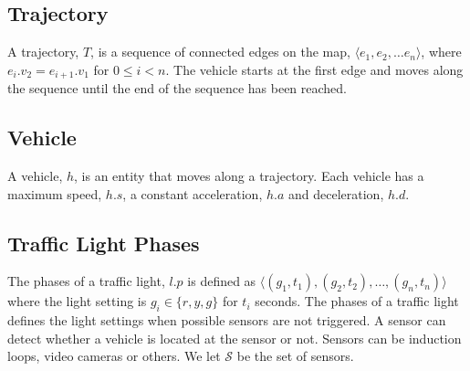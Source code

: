 \subsection{Trajectory}
A trajectory, $T$, is a sequence of connected edges on the map, $\langle e_1, e_2, \dots e_n \rangle$, where $e_i.v_2 = e_{i+1}.v_1$ for $0\leq i< n$.
The vehicle starts at the first edge and moves along the sequence until the end of the sequence has been reached.

\begin{comment}
A trajectory is a sequence of connected edges on the map, on which a vehicle can move. The vehicle starts at the first edge and moves along the sequence until the end of the sequence has been reached.
Let 
\[
\mathcal{T}_E = \{(e_1, e_2, \dots, e_n)\mid e_i \in E\}
\]
and be the set of all trajectories and $t\in \mathcal{T}$ be one such trajectory.
\end{comment}

\subsection{Vehicle}
A vehicle, $h$, is an entity that moves along a trajectory.
Each vehicle has a maximum speed, $h.s$, a constant acceleration, $h.a$ and deceleration, $h.d$.

\begin{comment}
A vehicle is an entity that moves along a trajectory. Each vehicle has a maximum speed and a constant acceleration and deceleration.
Let
\[
\mathcal{H} = \{(s, a, d)\mid s, a, d\in \mathbb{N}\}
\]
and be the set of all vehicles and $h\in \mathcal{H}$ be one such vehicle.
\end{comment}

\subsection{Traffic Light Phases}
The phases of a traffic light, $l.p$ is defined as $\langle(g_1, t_1),(g_2, t_2),\dots, (g_n, t_n) \rangle$ where the light setting is $g_i\in \{r, y, g\}$ for $t_i$ seconds.
The phases of a traffic light defines the light settings when possible sensors are not triggered. 
A sensor can detect whether a vehicle is located at the sensor or not. Sensors can be induction loops, video cameras or others. We let $\mathcal{S}$ be the set of sensors.
\begin{comment}
A traffic light controls the flow of traffic at a junction (vertice). 
There is a program of red, yellow and green light setting for each connection between two lanes in the junction.
We call this a program or \textit{phase}. A phase, $P$, is a sequence of light settings and time spans. A light setting can either be green, red or yellow. At a green light traffic is allowed to pass the junction along the connection, at red light, traffic is stopped, and a yellow light setting signals a change between red and green. Hence $P$ is defined as
\[
\mathcal{P} =\{ \langle(g_1, t_1),(g_2, t_2),\dots, (g_n, t_n) \rangle\mid g_i\in \{r, y, g\}, t_i\in \mathbb{N}\}
\]
\end{comment}


